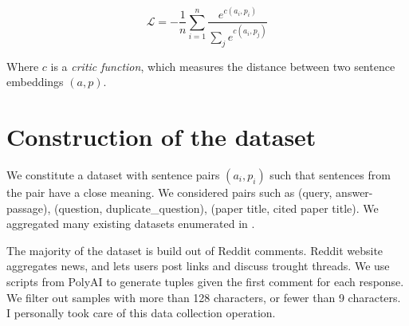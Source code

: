 \begin{equation}
    \mathcal{L} = -\frac{1}{n}\sum_{i=1}^n\frac{e^{c(a_i, p_i)}}{\sum_j e^{c(a_i, p_j)}}    
\end{equation}

Where $c$ is a \textit{critic function}, which measures the distance between two sentence embeddings $(a, p)$.



\section{Construction of the dataset}

We constitute a dataset with sentence pairs $(a_i, p_i)$ such that sentences from the pair have a close meaning. We considered pairs such as (query, answer-passage), (question, duplicate\_question), (paper title, cited paper title). We aggregated many existing datasets enumerated in . 

The majority of the dataset is build out of Reddit comments. Reddit website aggregates news, and lets users post links and discuss trought threads. We use scripts from PolyAI to generate tuples given the first comment for each response. We filter out samples with more than 128 characters, or fewer than 9 characters. I personally took care of this data collection operation.

